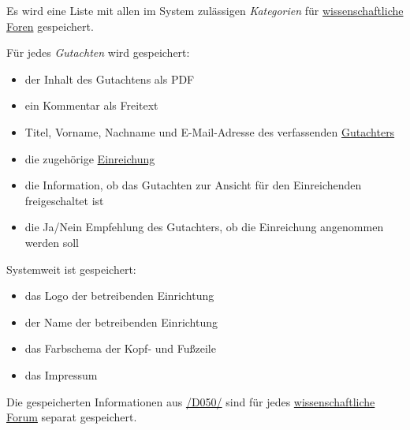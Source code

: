 \begin{description}
	 Es wird eine Liste mit allen im System zulässigen \emph{Kategorien} für \hyperref[d030]{wissenschaftliche Foren} gespeichert.

	 Für jedes \emph{Gutachten} wird gespeichert:
	\begin{itemize}
		\item der Inhalt des Gutachtens als PDF
		\item ein Kommentar als Freitext
		\item Titel, Vorname, Nachname und E-Mail-Adresse des verfassenden \hyperref[funkt:Gutachter]{Gutachters}
		\item die zugehörige \hyperref[d025]{Einreichung}
		\item die Information, ob das Gutachten zur Ansicht für den Einreichenden freigeschaltet ist
		\item die Ja/Nein Empfehlung des Gutachters, ob die Einreichung angenommen werden soll
	\end{itemize}

	 Systemweit ist gespeichert:
	\begin{itemize}
		\item das Logo der betreibenden Einrichtung
		\item der Name der betreibenden Einrichtung
		\item das Farbschema der Kopf- und Fußzeile
		\item das Impressum
	\end{itemize}

	 Die gespeicherten Informationen aus \hyperref[d050]{/D050/} sind für jedes \hyperref[d030]{wissenschaftliche Forum} separat gespeichert.
\end{description}